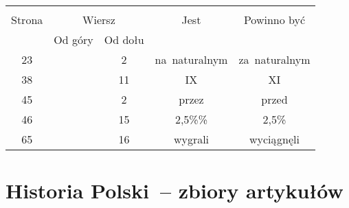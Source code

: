 \documentclass[a4paper,11pt]{article}
\begin{document}


\begin{center}

  \begin{tabular}{|c|c|c|c|c|}
    \hline
    & \multicolumn{2}{c|}{} & & \\
    Strona & \multicolumn{2}{c|}{Wiersz} & Jest
                              & Powinno być \\ \cline{2-3}
    & Od góry & Od dołu & & \\
    \hline
    23 & &  2 & na~naturalnym & za~naturalnym \\
    38 & & 11 & IX & XI \\
    45 & &  2 & przez & przed \\
    46 & & 15 & 2,5\%\% & 2,5\% \\
    65 & & 16 & wygrali & wyciągnęli \\
    \hline
  \end{tabular}

\end{center}


\vspace{\spaceTwo}










\section{Historia Polski~-- zbiory artykułów}

\vspace{\spaceTwo}





\end{document}

